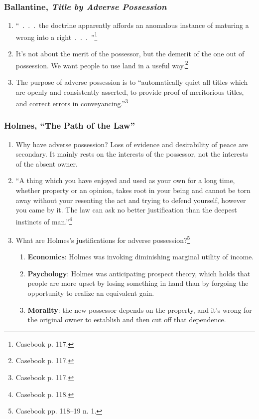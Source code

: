 \subsubsection{Ballantine, \emph{Title by Adverse Possession}}

\begin{enumerate}
    \item ``~.~.~.~the doctrine apparently affords an anomalous instance of 
    maturing a wrong into a right~.~.~.~''\footnote{Casebook p. 117.}
    \item It's not about the merit of the possessor, but the demerit of the 
    one out of possession. We want people to use land in a useful 
    way.\footnote{Casebook p. 117.}
    \item The purpose of adverse possession is to ``automatically quiet all 
    titles which are openly and consistently asserted, to provide proof of 
    meritorious titles, and correct errors in 
    conveyancing.''\footnote{Casebook p. 117.}
\end{enumerate}

\subsubsection{Holmes, ``The Path of the Law''}

\begin{enumerate}
    \item Why have adverse possession? Loss of evidence and desirability of 
    peace are secondary. It mainly rests on the interests of the possessor, 
    not the interests of the absent owner.
    \item ``A thing which you have enjoyed and used as your own for a long 
    time, whether property or an opinion, takes root in your being and cannot 
    be torn away without your resenting the act and trying to defend yourself, 
    however you came by it. The law can ask no better justification than the 
    deepest instincts of man.''\footnote{Casebook p. 118.}
    \item What are Holmes's justifications for adverse 
    possession?\footnote{Casebook pp. 118--19 n. 1.}
    \begin{enumerate}
        \item \textbf{Economics}: Holmes was invoking diminishing marginal 
        utility of income.
        \item \textbf{Psychology}: Holmes was anticipating prospect theory, 
        which holds that people are more upset by losing something in hand 
        than by forgoing the opportunity to realize an equivalent gain.
        \item \textbf{Morality}: the new possessor depends on the property, 
        and it's wrong for the original owner to establish and then cut off 
        that dependence.
    \end{enumerate}
\end{enumerate}

